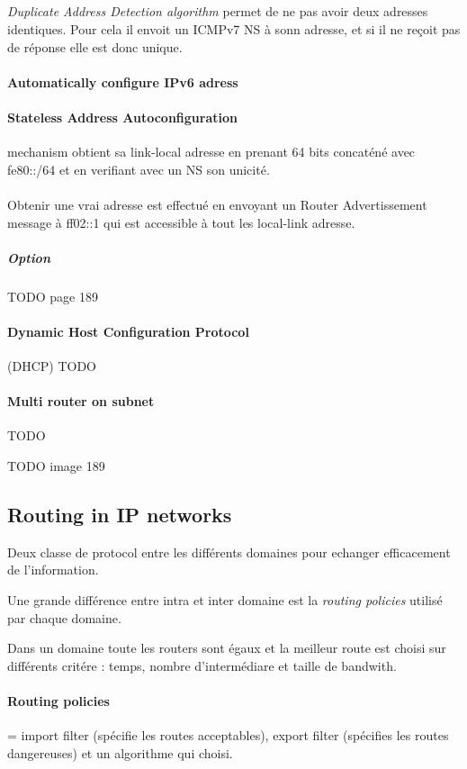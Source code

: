 \subparagraph{ }
\textit{Duplicate Address Detection algorithm} permet de ne pas avoir deux adresses identiques.
Pour cela il envoit un ICMPv7 NS à sonn adresse, et si il ne reçoit pas de réponse elle est
donc unique.

\paragraph{Automatically configure IPv6 adress}
\paragraph{Stateless Address Autoconfiguration} mechanism obtient sa link-local adresse
en prenant 64 bits concaténé avec fe80::/64 et en verifiant avec un NS son unicité.

\paragraph{ }
Obtenir  une   vrai  adresse  est   effectué  en  envoyant   un  Router
Advertissement  message  à  ff02::1  qui est  accessible  à  tout  les
local-link adresse.

\subparagraph{Option}
TODO page 189

\paragraph{Dynamic Host Configuration Protocol} (DHCP)
TODO

\paragraph{Multi router on subnet}
TODO



TODO image 189

\subsection{Routing in IP networks}
Deux classe de protocol entre les différents domaines pour echanger
efficacement de l'information.

Une grande différence entre intra et inter domaine est la \textit{routing policies}
utilisé par chaque domaine.

Dans un domaine toute les routers sont égaux et la meilleur route est choisi sur
différents critére : temps, nombre d'intermédiare et taille de bandwith.

\paragraph{Routing  policies}  =  import filter  (spécifie  les  routes
acceptables), export  filter (spécifies  les routes dangereuses)  et un
algorithme qui choisi.


